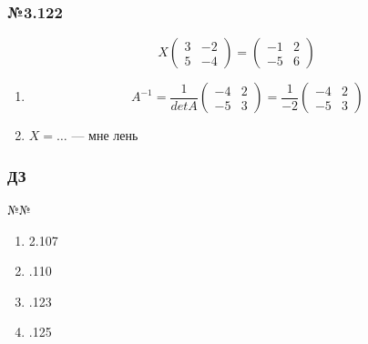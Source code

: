 \documentclass{article}
\begin{document}
\subsubsection*{№3.122}

\[
X \begin{pmatrix}
	3 & -2 \\
	5 & -4
\end{pmatrix} =
\begin{pmatrix}
	-1 & 2 \\
	-5 & 6
\end{pmatrix}
\]

\begin{enumerate}
	\item \[
	A^{-1} = \frac{1}{det A} \begin{pmatrix}
		-4 & 2 \\
		-5 & 3
	\end{pmatrix} =
	\frac{1}{-2} \begin{pmatrix}
		-4 & 2 \\
		-5 & 3
	\end{pmatrix}
	\]
	\item $X = \dots$ --- мне лень
\end{enumerate}

\subsubsection{ДЗ}

№№
\begin{enumerate}
	\item 2.107
	\item .110
	\item .123
	\item .125
\end{enumerate}
\end{document}
